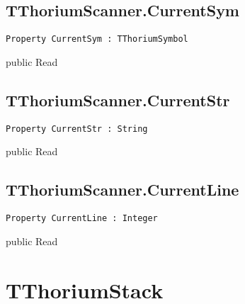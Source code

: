\subsection{TThoriumScanner.CurrentSym}
\label{thoriumcore:thorium:tthoriumscanner:currentsym}
\begin{FPCList}
\Synopsis
\Declaration 

\begin{verbatim}
Property CurrentSym : TThoriumSymbol
\end{verbatim}
\Visibility
public
\Access
Read
\Description
\end{FPCList}
\subsection{TThoriumScanner.CurrentStr}
\label{thoriumcore:thorium:tthoriumscanner:currentstr}
\begin{FPCList}
\Synopsis
\Declaration 

\begin{verbatim}
Property CurrentStr : String
\end{verbatim}
\Visibility
public
\Access
Read
\Description
\end{FPCList}
\subsection{TThoriumScanner.CurrentLine}
\label{thoriumcore:thorium:tthoriumscanner:currentline}
\begin{FPCList}
\Synopsis
\Declaration 

\begin{verbatim}
Property CurrentLine : Integer
\end{verbatim}
\Visibility
public
\Access
Read
\Description
\end{FPCList}
\section{TThoriumStack}
\label{thoriumcore:thorium:tthoriumstack}
